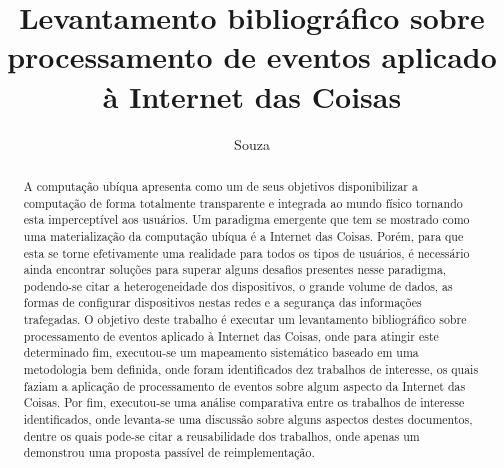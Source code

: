 \documentclass[ti,table]{texufpel} %
\title{Levantamento bibliográfico sobre processamento de eventos aplicado à Internet das Coisas}
\author{Souza}{Weslen Schiavon}
\begin{document}
 

  

\renewcommand{\advisorname}{Orientadora}           %

\renewcommand{\coadvisorname}{Coorientador}      %

  

\maketitle  

  

\sloppy 

  


  

  

\begin{abstract} 

A computação ubíqua apresenta como um de seus objetivos disponibilizar a computação de forma totalmente transparente e integrada ao mundo físico tornando esta imperceptível aos usuários. Um paradigma emergente que tem se mostrado como uma materialização da computação ubíqua é a Internet das Coisas. Porém, para que esta se torne efetivamente uma realidade para todos os tipos de usuários, é necessário ainda encontrar soluções para superar alguns desafios presentes nesse paradigma, podendo-se citar a heterogeneidade dos dispositivos, o grande volume de dados, as formas de configurar dispositivos nestas redes e a segurança das informações trafegadas. O objetivo deste trabalho é executar um levantamento bibliográfico sobre processamento de eventos aplicado à Internet das Coisas, onde para atingir este determinado fim, executou-se um mapeamento sistemático baseado em uma metodologia bem definida, onde foram identificados dez trabalhos de interesse, os quais faziam a aplicação de processamento de eventos sobre algum aspecto da Internet das Coisas. Por fim, executou-se uma análise comparativa entre os trabalhos de interesse identificados, onde levanta-se uma discussão sobre alguns aspectos destes documentos, dentre os quais pode-se citar a reusabilidade dos trabalhos, onde apenas um demonstrou uma proposta passível de reimplementação. 

\end{abstract} 

  

  
\end{document}
